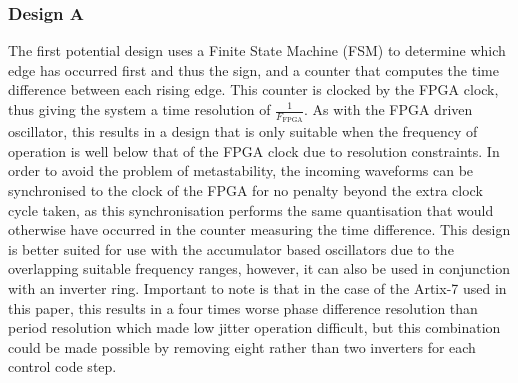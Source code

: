 \documentclass[conference]{IEEEtran}
\begin{document}
{\subsubsection*{Design A}
The first potential design uses a Finite State Machine (FSM) to determine which edge has occurred first and thus the sign, and a counter that computes the time difference between each rising edge. This counter is clocked by the FPGA clock, thus giving the system a time resolution of $\frac{1}{F_{\textrm{FPGA}}}$. As with the FPGA driven oscillator, this results in a design that is only suitable when the frequency of operation is well below that of the FPGA clock due to resolution constraints. In order to avoid the problem of metastability, the incoming waveforms can be synchronised to the clock of the FPGA for no penalty beyond the extra clock cycle taken, as this synchronisation performs the same quantisation that would otherwise have occurred in the counter measuring the time difference. This design is better suited for use with the accumulator based oscillators due to the overlapping suitable frequency ranges, however, it can also be used in conjunction with an inverter ring. Important to note is that in the case of the Artix-7 used in this paper, this results in a four times worse phase difference resolution than period resolution which made low jitter operation difficult, but this combination could be made possible by removing eight rather than two inverters for each control code step. %

}
\end{document}
